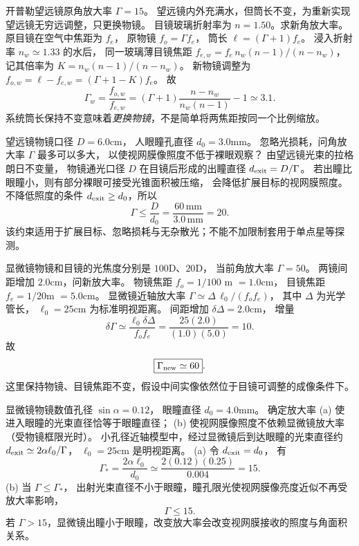 开普勒望远镜原角放大率 $\Gamma=15$。
望远镜内外充满水，但筒长不变，为重新实现望远镜无穷远调整，只更换物镜。
目镜玻璃折射率为 $n=1.50$。求新角放大率。
\exsolution
原目镜在空气中焦距为 $f_e$，
原物镜 $f_o=\Gamma f_e$，
筒长 $\ell=(\Gamma+1)f_e$。
浸入折射率 $n_w\simeq1.33$ 的水后，
同一玻璃薄目镜焦距
$f_{e,w}=f_e\,n_w(n-1)/(n-n_w)$，
记其倍率为
$K=n_w(n-1)/(n-n_w)$。
新物镜调整为
$f_{o,w}=\ell-f_{e,w}
=(\Gamma+1-K)f_e$。
故
\[
\boxed{\Gamma_w=
\frac{f_{o,w}}{f_{e,w}}
=(\Gamma+1)\frac{n-n_w}{n_w(n-1)}-1
\simeq3.1}.
\]
\excheck 系统筒长保持不变意味着\emph{更换物镜}，不是简单将两焦距按同一个比例缩放。

望远镜物镜口径
$D=6.0$cm，
人眼瞳孔直径
$d_0=3.0$mm。
忽略光损耗，问角放大率 $\Gamma$ 最多可以多大，
以使视网膜像照度不低于裸眼观察？
\exsolution
由望远镜光束的拉格朗日不变量，
物镜通光口径 $D$ 在目镜后形成的出瞳直径
$d_{\rm exit}=D/\Gamma$。
若出瞳比眼瞳小，则有部分裸眼可接受光锥面积被压缩，
会降低扩展目标的视网膜照度。
不降低照度的条件
$d_{\rm exit}\ge d_0$，所以
\[
\boxed{\Gamma\le\frac D{d_0}
=\frac{60\,\mathrm{mm}}{3.0\,\mathrm{mm}}
=20}.
\]
\excheck 该约束适用于扩展目标、忽略损耗与无杂散光；不能不加限制套用于单点星等探测。

显微镜物镜和目镜的光焦度分别是
$100$D、$20$D，
当前角放大率 $\Gamma=50$。
两镜间距增加 $2.0$cm，问新放大率。
\exsolution
物镜焦距 $f_o=1/100$ m $=1.0$cm，
目镜焦距 $f_e=1/20$m $=5.0$cm。
显微镜近轴放大率
$\Gamma\simeq\Delta\,\ell_0/(f_of_e)$，
其中 $\Delta$ 为光学管长，
$\ell_0=25$cm 为标准明视距离。
间距增加 $\delta\Delta=2.0$cm，
增量
\[
\delta\Gamma\simeq\frac{\ell_0\delta\Delta}
{f_of_e}
=\frac{25(2.0)}{(1.0)(5.0)}
=10.
\]
故
\[
\boxed{\Gamma_{\rm new}\simeq60}.
\]
\excheck 这里保持物镜、目镜焦距不变，假设中间实像依然位于目镜可调整的成像条件下。

显微镜物镜数值孔径
$\sin\alpha=0.12$，
眼瞳直径
$d_0=4.0$mm。
确定放大率
(a) 使进入眼瞳的光束直径恰等于眼瞳直径；
(b) 使视网膜像照度不依赖显微镜放大率（受物镜框限光时）。
\exsolution
小孔径近轴模型中，经过显微镜后到达眼瞳的光束直径约
$d_{\rm exit}\simeq2\alpha\ell_0/\Gamma$，
$\ell_0=25$cm 是明视距离。
(a) 令
$d_{\rm exit}=d_0$，
有
\[
\boxed{\Gamma_*=\frac{2\alpha\ell_0}{d_0}
\simeq\frac{2(0.12)(0.25)}{0.004}
=15}.
\]
(b) 当 $\Gamma\le\Gamma_*$，
出射光束直径不小于眼瞳，瞳孔限光使视网膜像亮度近似不再受放大率影响，
\[
\boxed{\Gamma\le15}.
\]
\excheck 若 $\Gamma>15$，显微镜出瞳小于眼瞳，改变放大率会改变视网膜接收的照度与角面积关系。

